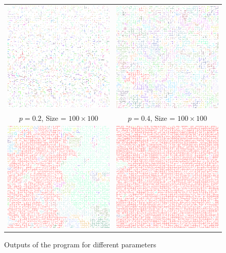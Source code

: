 \documentclass[a4paper,11pt]{article}
\theoremstyle{plain}
\theoremstyle{definition}
\theoremstyle{remark}
\begin{document}
\begin{figure}
\centering
\caption{Outputs of the program for different parameters}
\begin{tabular}{cc}
\label{tab:simulation}
  \includegraphics[width=55mm]{p20} &   \includegraphics[width=55mm]{p40} \\
$p = 0.2$, Size = $100 \times 100$ & $p = 0.4$, Size = $100 \times 100$  \\[6pt]
 \includegraphics[width=55mm]{p50} &   \includegraphics[width=55mm]{p60} \\

\end{tabular}
\end{figure}
\end{document}

